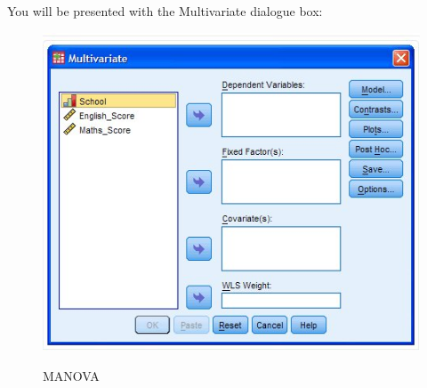 \documentclass[12pt]{article} %
\begin{document}
You will be presented with the Multivariate dialogue box:

\begin{center}
\begin{figure}[h!]
  \includegraphics[scale=0.4]{MANOVA1}\\
  \caption{MANOVA}
\end{figure}
\end{center}
\end{document}
